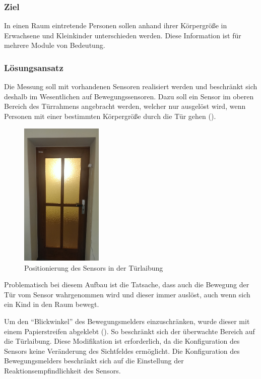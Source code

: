 \subsubsection{Ziel}
In einen Raum eintretende Personen sollen anhand ihrer Körpergröße in Erwachsene und Kleinkinder unterschieden werden. Diese Information ist für mehrere Module von Bedeutung. 

\subsubsection{Lösungsansatz}
Die Messung soll mit vorhandenen Sensoren realisiert werden und beschränkt sich deshalb im Wesentlichen auf Bewegungssensoren. Dazu soll ein Sensor im oberen Bereich des Türrahmens angebracht werden, welcher nur ausgelöst wird, wenn Personen mit einer bestimmten Körpergröße durch die Tür gehen ().

\begin{figure}[h!]
	\centering
	\includegraphics[width=0.35\textwidth]{img/PersonIdentification/Aeotec1.jpg}
	\caption{Positionierung des Sensors in der Türlaibung}
	\label{fig:personIdentificationAeotec1}
\end{figure}

Problematisch bei diesem Aufbau ist die Tatsache, dass auch die Bewegung der Tür vom Sensor wahrgenommen wird und dieser immer auslöst, auch wenn sich ein Kind in den Raum bewegt.

Um den "`Blickwinkel"' des Bewegungsmelders einzuschränken, wurde dieser mit einem Papierstreifen abgeklebt (). So beschränkt sich der überwachte Bereich auf die Türlaibung. Diese Modifikation ist erforderlich, da die Konfiguration des Sensors keine Veränderung des Sichtfeldes ermöglicht. Die Konfiguration des Bewegungsmelders beschränkt sich auf die Einstellung der Reaktionsempfindlichkeit des Sensors.

